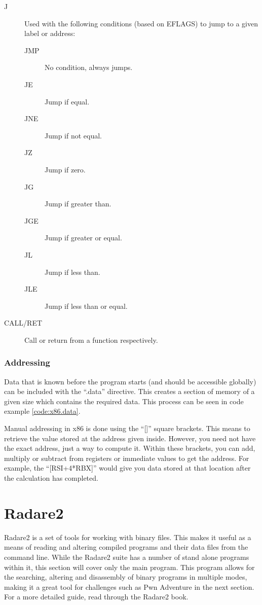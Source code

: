 \begin{description}
					\item[J] Used with the following conditions (based on EFLAGS) to jump to a given label or address:
						\begin{description}
							\item[JMP] No condition, always jumps. 
							\item[JE] Jump if equal. 
							\item[JNE] Jump if not equal. 
							\item[JZ] Jump if zero. 
							\item[JG] Jump if greater than.
							\item[JGE] Jump if greater or equal. 
							\item[JL] Jump if less than. 
							\item[JLE] Jump if less than or equal. 
						\end{description}
					\item[CALL/RET] Call or return from a function respectively. 
				\end{description}
			\subsubsection{Addressing}
				Data that is known before the program starts (and should be accessible globally) can be included with the ``.data'' directive. 
				This creates a section of memory of a given size which contains the required data. 
				This process can be seen in code example \ref{code:x86.data}. 
				\begin{code}
					Assembler}]{./x86.data}
					\caption{Using the .data Section of x86 Assembly}
					\label{code:x86.data}
				\end{code}

				Manual addressing in x86 is done using the ``[]'' square brackets. 
				This means to retrieve the value stored at the address given inside. 
				However, you need not have the exact address, just a way to compute it. 
				Within these brackets, you can add, multiply or subtract from registers or immediate values to get the address. 
				For example, the ``[RSI+4*RBX]'' would give you data stored at that location after the calculation has completed. 


	\section{Radare2}
		Radare2 is a set of tools for working with binary files. 
		This makes it useful as a means of reading and altering compiled programs and their data files from the command line. 
		While the Radare2 suite has a number of stand alone programs within it, this section will cover only the main program. 
		This program allows for the searching, altering and disassembly of binary programs in multiple modes, making it a great tool for challenges such as Pwn Adventure in the next section.
		For a more detailed guide, read through the Radare2 book.\cite{Radare2}

